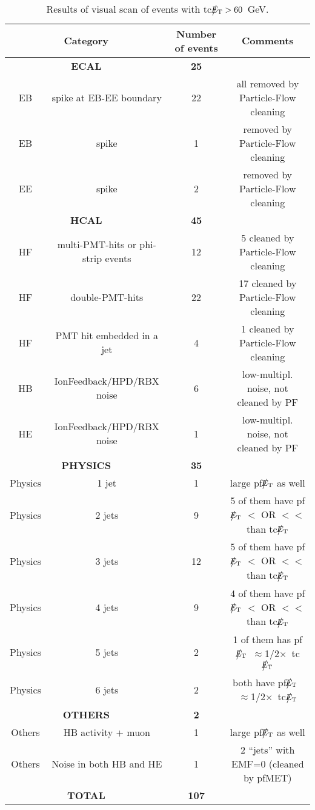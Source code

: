 \begin{table}[htbp]
  \begin{center}
    \begin{tabular}{|c|c|c|c|}
      \hline
      \multicolumn{2}{|c|}{Category} & Number of events  & Comments   \\ 
      \hline\hline
      \multicolumn{2}{|c|}{\bf ECAL} & \bf{25}      &  \\
      \hline
      EB & spike at EB-EE boundary & 22 & all removed by Particle-Flow cleaning \\     
      EB & spike & 1 & removed by Particle-Flow cleaning \\     
      EE & spike & 2 & removed by Particle-Flow cleaning \\     
      \hline    
      \multicolumn{2}{|c|}{\bf HCAL} & \bf{45}      &  \\
      \hline
      HF & multi-PMT-hits or phi-strip events & 12 & 5 cleaned by Particle-Flow cleaning \\           
      HF & double-PMT-hits & 22 & 17 cleaned by Particle-Flow cleaning \\           
      HF & PMT hit embedded in a jet & 4 & 1 cleaned by Particle-Flow cleaning \\           
      HB & IonFeedback/HPD/RBX noise & 6 & low-multipl. noise, not cleaned by PF\\           
      HE & IonFeedback/HPD/RBX noise & 1 & low-multipl. noise, not cleaned by PF \\           
      \hline    
      \multicolumn{2}{|c|}{\bf PHYSICS} & \bf{35}      &  \\
      \hline
      Physics & 1 jet & 1 & large pf$\big\slash\hspace{-1.6ex}{E_\text{T}}$ as well \\
      Physics & 2 jets & 9 & 5 of them have pf$\big\slash\hspace{-1.6ex}{E_\text{T}}$ $<$ OR $<<$ than tc$\big\slash\hspace{-1.6ex}{E_\text{T}}$ \\
      Physics & 3 jets & 12 & 5 of them have pf$\big\slash\hspace{-1.6ex}{E_\text{T}}$ $<$ OR $<<$ than tc$\big\slash\hspace{-1.6ex}{E_\text{T}}$ \\
      Physics & 4 jets & 9 & 4 of them have pf$\big\slash\hspace{-1.6ex}{E_\text{T}}$ $<$ OR $<<$ than tc$\big\slash\hspace{-1.6ex}{E_\text{T}}$ \\
      Physics & 5 jets & 2 & 1 of them has pf$\big\slash\hspace{-1.6ex}{E_\text{T}}$~$\approx$1/2$\times$~tc$\big\slash\hspace{-1.6ex}{E_\text{T}}$\\
      Physics & 6 jets & 2 & both have pf$\big\slash\hspace{-1.6ex}{E_\text{T}}$~$\approx$1/2$\times$~tc$\big\slash\hspace{-1.6ex}{E_\text{T}}$\\
      \hline
      \multicolumn{2}{|c|}{\bf OTHERS} & \bf{2}      &  \\
      \hline          
      Others & HB activity + muon & 1 & large pf$\big\slash\hspace{-1.6ex}{E_\text{T}}$ as well \\
      Others & Noise in both HB and HE  & 1 & 2 ``jets'' with EMF=0 (cleaned by pfMET) \\
      \hline          
      \multicolumn{2}{|c|}{\bf TOTAL} & \bf{107}      &  \\
      \hline
    \end{tabular}
    \caption{Results of visual scan of events with tc$\big\slash\hspace{-1.6ex}{E_\text{T}}>60$~GeV.}        
    \label{tab:tcMETskim}
  \end{center}
\end{table}
